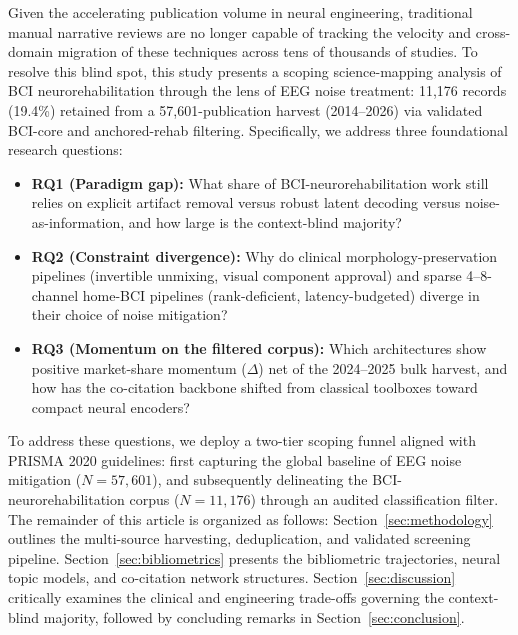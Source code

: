 \documentclass[preprint,12pt]{elsarticle}
\begin{document}
Given the accelerating publication volume in neural engineering, traditional manual narrative reviews are no longer capable of tracking the velocity and cross-domain migration of these techniques across tens of thousands of studies. To resolve this blind spot, this study presents a scoping science-mapping analysis of BCI neurorehabilitation through the lens of EEG noise treatment: 11,176 records (19.4\%) retained from a 57,601-publication harvest (2014--2026) via validated BCI-core and anchored-rehab filtering. Specifically, we address three foundational research questions:
\begin{itemize}
    \item \textbf{RQ1 (Paradigm gap):} What share of BCI-neurorehabilitation work still relies on explicit artifact removal versus robust latent decoding versus noise-as-information, and how large is the context-blind majority?
    \item \textbf{RQ2 (Constraint divergence):} Why do clinical morphology-preservation pipelines (invertible unmixing, visual component approval) and sparse 4--8-channel home-BCI pipelines (rank-deficient, latency-budgeted) diverge in their choice of noise mitigation?
    \item \textbf{RQ3 (Momentum on the filtered corpus):} Which architectures show positive market-share momentum ($\Delta$) net of the 2024--2025 bulk harvest, and how has the co-citation backbone shifted from classical toolboxes toward compact neural encoders?
\end{itemize}
To address these questions, we deploy a two-tier scoping funnel aligned with PRISMA 2020 guidelines: first capturing the global baseline of EEG noise mitigation ($N = 57{,}601$), and subsequently delineating the BCI-neurorehabilitation corpus ($N = 11{,}176$) through an audited classification filter. The remainder of this article is organized as follows: Section~\ref{sec:methodology} outlines the multi-source harvesting, deduplication, and validated screening pipeline. Section~\ref{sec:bibliometrics} presents the bibliometric trajectories, neural topic models, and co-citation network structures. Section~\ref{sec:discussion} critically examines the clinical and engineering trade-offs governing the context-blind majority, followed by concluding remarks in Section~\ref{sec:conclusion}.
\end{document}
